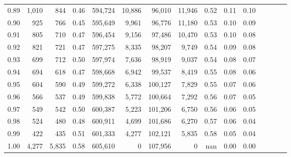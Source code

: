 \begin{tabular}{rrrcrrrrrrrrrrr}
0.89 &   1,010 &    844 &                                       0.46 &  594,724 &   10,886 &   96,010 &   11,946 &  0.52 &  0.11 &                         0.10 \\
0.90 &     925 &    766 &                                       0.45 &  595,649 &    9,961 &   96,776 &   11,180 &  0.53 &  0.10 &                         0.09 \\
0.91 &     805 &    710 &                                       0.47 &  596,454 &    9,156 &   97,486 &   10,470 &  0.53 &  0.10 &                         0.08 \\
0.92 &     821 &    721 &                                       0.47 &  597,275 &    8,335 &   98,207 &    9,749 &  0.54 &  0.09 &                         0.08 \\
0.93 &     699 &    712 &                                       0.50 &  597,974 &    7,636 &   98,919 &    9,037 &  0.54 &  0.08 &                         0.07 \\
0.94 &     694 &    618 &                                       0.47 &  598,668 &    6,942 &   99,537 &    8,419 &  0.55 &  0.08 &                         0.06 \\
0.95 &     604 &    590 &                                       0.49 &  599,272 &    6,338 &  100,127 &    7,829 &  0.55 &  0.07 &                         0.06 \\
0.96 &     566 &    537 &                                       0.49 &  599,838 &    5,772 &  100,664 &    7,292 &  0.56 &  0.07 &                         0.05 \\
0.97 &     549 &    542 &                                       0.50 &  600,387 &    5,223 &  101,206 &    6,750 &  0.56 &  0.06 &                         0.05 \\
0.98 &     524 &    480 &                                       0.48 &  600,911 &    4,699 &  101,686 &    6,270 &  0.57 &  0.06 &                         0.04 \\
0.99 &     422 &    435 &                                       0.51 &  601,333 &    4,277 &  102,121 &    5,835 &  0.58 &  0.05 &                         0.04 \\
1.00 &   4,277 &  5,835 &                                       0.58 &  605,610 &        0 &  107,956 &        0 &   nan &  0.00 &                         0.00 \\
\bottomrule
\end{tabular}
